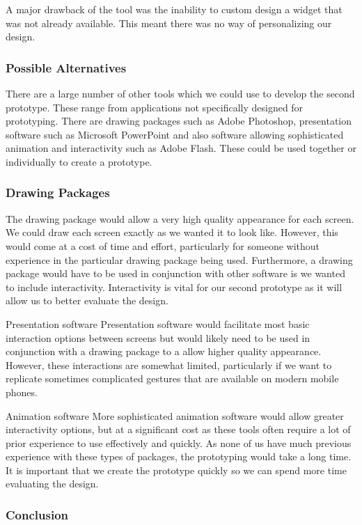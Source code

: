 A major drawback of the tool was the inability to custom design a widget that
was not already available.  This meant there was no way of personalizing our
design.

\subsubsection{Possible Alternatives}

There are a large number of other tools which we could use to develop the
second prototype. These range from applications not specifically designed for
prototyping. There are drawing packages such as Adobe Photoshop, presentation
software such as Microsoft PowerPoint and also software allowing sophisticated
animation and interactivity such as Adobe Flash. These could be used together
or individually to create a prototype.

\subsubsection{Drawing Packages}

The drawing package would allow a very high quality appearance for each screen.
We could draw each screen exactly as we wanted it to look like. However, this
would come at a cost of time and effort, particularly for someone without
experience in the particular drawing package being used. Furthermore, a drawing
package would have to be used in conjunction with other software is we wanted
to include interactivity. Interactivity is vital for our second prototype as it
will allow us to better evaluate the design.

Presentation software Presentation software would facilitate most basic
interaction options between screens but would likely need to be used in
conjunction with a drawing package to a allow higher quality appearance.
However, these interactions are somewhat limited, particularly if we want to
replicate sometimes complicated gestures that are available on modern mobile
phones.

Animation software More sophisticated animation software would allow greater
interactivity options, but at a significant cost as these tools often require a
lot of prior experience to use effectively and quickly. As none of us have much
previous experience with these types of packages, the prototyping would take a
long time. It is important that we create the prototype quickly so we can spend
more time evaluating the design.

\subsubsection{Conclusion}

